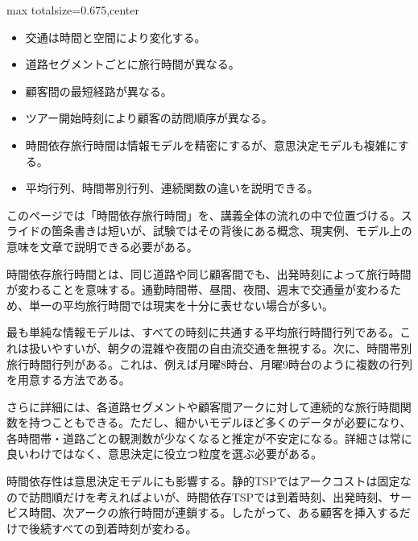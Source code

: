\clearpage
{}
\begin{adjustbox}{max totalsize={\textwidth}{0.675\textheight},center}
\begin{minipage}{\textwidth}\scriptsize
\begin{minipage}[t]{0.485\textwidth}
\begin{itemize}
\item 交通は時間と空間により変化する。
\item 道路セグメントごとに旅行時間が異なる。
\item 顧客間の最短経路が異なる。
\item ツアー開始時刻により顧客の訪問順序が異なる。
\end{itemize}
\begin{itemize}
\item 時間依存旅行時間は情報モデルを精密にするが、意思決定モデルも複雑にする。
\item 平均行列、時間帯別行列、連続関数の違いを説明できる。
\end{itemize}
\end{minipage}\hfill
\begin{minipage}[t]{0.485\textwidth}
このページでは「時間依存旅行時間」を、講義全体の流れの中で位置づける。スライドの箇条書きは短いが、試験ではその背後にある概念、現実例、モデル上の意味を文章で説明できる必要がある。\par
時間依存旅行時間とは、同じ道路や同じ顧客間でも、出発時刻によって旅行時間が変わることを意味する。通勤時間帯、昼間、夜間、週末で交通量が変わるため、単一の平均旅行時間では現実を十分に表せない場合が多い。\par
最も単純な情報モデルは、すべての時刻に共通する平均旅行時間行列である。これは扱いやすいが、朝夕の混雑や夜間の自由流交通を無視する。次に、時間帯別旅行時間行列がある。これは、例えば月曜8時台、月曜9時台のように複数の行列を用意する方法である。\par
さらに詳細には、各道路セグメントや顧客間アークに対して連続的な旅行時間関数を持つこともできる。ただし、細かいモデルほど多くのデータが必要になり、各時間帯・道路ごとの観測数が少なくなると推定が不安定になる。詳細さは常に良いわけではなく、意思決定に役立つ粒度を選ぶ必要がある。\par
時間依存性は意思決定モデルにも影響する。静的TSPではアークコストは固定なので訪問順だけを考えればよいが、時間依存TSPでは到着時刻、出発時刻、サービス時間、次アークの旅行時間が連鎖する。したがって、ある顧客を挿入するだけで後続すべての到着時刻が変わる。\par

\end{minipage}
\end{minipage}
\end{adjustbox}
